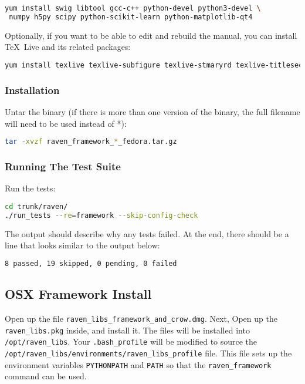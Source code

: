 \begin{lstlisting}[language=bash]
yum install swig libtool gcc-c++ python-devel python3-devel \
 numpy h5py scipy python-scikit-learn python-matplotlib-qt4
\end{lstlisting}

Optionally, if you want to be able to edit and rebuild the manual, you can 
install \TeX~Live and its related packages:
\begin{lstlisting}[language=bash]
yum install texlive texlive-subfigure texlive-stmaryrd texlive-titlesec texlive-preprint
\end{lstlisting}

\subsubsection{Installation}
Untar the binary (if there is more than one version of the
binary, the full filename will need to be used instead of *):

\begin{lstlisting}[language=bash]
tar -xvzf raven_framework_*_fedora.tar.gz
\end{lstlisting}

\subsubsection{Running The Test Suite}
Run the tests:

\begin{lstlisting}[language=bash]
cd trunk/raven/
./run_tests --re=framework --skip-config-check
\end{lstlisting}

The output should describe why any tests failed.
%
At the end, there should be a line that looks similar to the output below:
\begin{lstlisting}[language=bash]
8 passed, 19 skipped, 0 pending, 0 failed
\end{lstlisting}

\subsection{OSX Framework Install}

Open up the file \texttt{raven\_libs\_framework\_and\_crow.dmg}.
%
Next, Open up the \texttt{raven\_libs.pkg} inside, and install it.
%
The files will be installed into \texttt{/opt/raven\_libs}.
%
Your \texttt{.bash\_profile} will be modified to source the
\texttt{/opt/raven\_libs/environments/raven\_libs\_profile} file.
%
This file sets up the environment variables \texttt{PYTHONPATH} and
\texttt{PATH} so that the \texttt{raven\_framework} command can be used.

